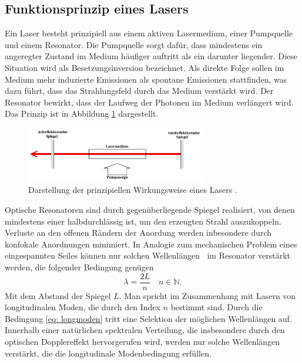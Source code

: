 \subsection{Funktionsprinzip eines Lasers}
Ein Laser besteht prinzipiell aus einem aktiven Lasermedium, einer Pumpquelle und einem Resonator. Die Pumpquelle sorgt dafür, dass
mindestens ein angeregter Zustand im Medium häufiger auftritt als ein darunter liegender. Diese Situation wird als Besetzungsinversion bezeichnet. Als direkte
Folge sollen im Medium mehr induzierte Emissionen als spontane Emissionen stattfinden, was dazu führt, dass das Strahlungsfeld durch das Medium verstärkt wird.
Der Resonator bewirkt, dass der Laufweg der Photonen im Medium verlängert wird. Das Prinzip ist in Abbildung \ref{fig: prinzip_laser} dargestellt.
\begin{figure}
  \centering
  \includegraphics[width = 0.7\textwidth]{theorie_bilder/prinzip_laser.png}
  \caption{Darstellung der prinzipiellen Wirkungsweise eines Lasers \cite{anleitung61}.}
  \label{fig: prinzip_laser}
\end{figure}

Optische Resonatoren sind durch gegenüberliegende Spiegel realisiert, von denen mindestens einer halbdurchlässig ist, um den erzeugten Strahl
auszukoppeln. Verluste an den offenen Rändern der Anordung werden inbesondere durch konfokale Anordnungen minimiert.
In Analogie zum mechanischen Problem eines eingespannten Seiles können nur solchen Wellenlängen $\
$ im Resonator verstärkt werden, die
folgender Bedingung genügen
\begin{equation}
  \lambda = \frac{2 L }{n} \quad n \in  \mathbb{N}.
  \label{eq: longmoden}
\end{equation}
Mit dem Abstand der Spiegel $L$. Man spricht im Zusammenhang mit Lasern von longitudinalen Moden, die durch den Index $n$ bestimmt sind.
Durch die Bedingung \eqref{eq: longmoden} tritt eine Selektion der möglichen Wellenlängen auf. Innerhalb
einer natürlichen spektralen Verteilung, die insbesondere durch den optischen Dopplereffekt hervorgerufen wird, werden nur solche Wellenlängen
verstärkt, die die longitudinale Modenbedingung erfüllen.

